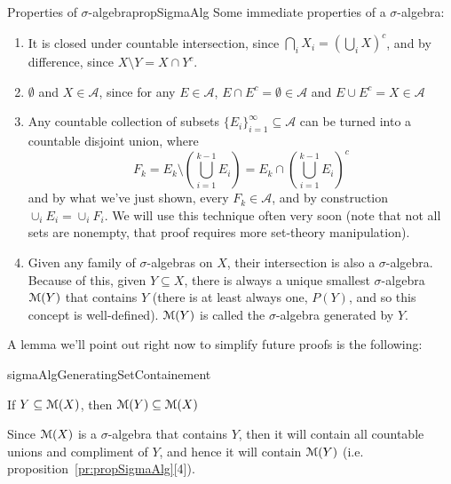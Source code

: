 \documentclass[oneside]{book}
\newcommand{\CA}{\mathcal{A}}
\newcommand{\MM}{\EuScript{M}}
\newcommand{\sse}{\subseteq}
\begin{document}
\begin{prop}{Properties of $\sigma$-algebra}{propSigmaAlg}
	Some immediate properties of a $\sigma$-algebra:
	\begin{enumerate}
		\item It is closed under countable intersection, since $\bigcap_i X_i = \left( \bigcup_i X \right)^c$, and by
			difference, since $X\setminus Y = X\cap Y^c$. 
		\item $\emptyset$ and $X \in \CA$, since for any $E \in \CA$, $E\cap E^c = \emptyset \in \CA$ and $E\cup E^c
			= X \in \CA$
		\item Any countable collection of subsets $\{E_i\}_{i=1}^\infty \sse \CA$ can be turned into a countable disjoint
			union, where
			\[
				F_k = E_k \setminus \left( \bigcup_{i=1}^{k-1}E_i\right) = E_k \cap \left(\bigcup_{i=1}^{k-1}E_i\right)^c
			\]
			and by what we've just shown, every $F_k \in \CA$, and by construction $\cup_i E_i = \cup_i F_i$. We will use
			this technique often very soon (note that not all sets are nonempty, that proof requires more set-theory
			manipulation).
		\item Given any family of $\sigma$-algebras on $X$, their intersection is also a $\sigma$-algebra. Because of this,
			given $Y \sse X$, there is always a unique smallest $\sigma$-algebra $\MM(Y)$ that contains $Y$ (there is at
			least always one, $P(Y)$, and so this concept is well-defined). $\MM(Y)$ is called the $\sigma$-algebra
			generated by $Y$. 
	\end{enumerate}
\end{prop}


A lemma we'll point out right now to simplify future proofs is the following:

\begin{lem}{}{sigmaAlgGeneratingSetContainement}

	If $Y \sse \MM(X)$, then $\MM(Y) \sse \MM(X)$
\end{lem}

\begin{Proof}
	Since $\MM(X)$ is a $\sigma$-algebra that contains $Y$, then it will contain all countable unions and compliment of
	$Y$, and hence it will contain $\MM(Y)$ (i.e. proposition~\ref{pr:propSigmaAlg}[4]). 
\end{Proof}
\end{document}
